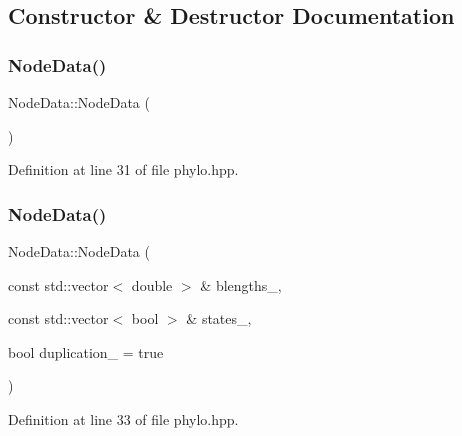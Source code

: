 \subsection{Constructor \& Destructor Documentation}
\mbox{\label{class_node_data_a56da12a9de7c80c25a905012749c8671}} 
\subsubsection{\texorpdfstring{Node\+Data()}{NodeData()}\hspace{0.1cm}{\footnotesize\ttfamily [1/2]}}
{\footnotesize\ttfamily Node\+Data\+::\+Node\+Data (\begin{DoxyParamCaption}{ }\end{DoxyParamCaption})\hspace{0.3cm}{\ttfamily [inline]}}



Definition at line 31 of file phylo.\+hpp.

\mbox{\label{class_node_data_a0a90191ba4c987afa3406f829967d8e2}} 
\subsubsection{\texorpdfstring{Node\+Data()}{NodeData()}\hspace{0.1cm}{\footnotesize\ttfamily [2/2]}}
{\footnotesize\ttfamily Node\+Data\+::\+Node\+Data (\begin{DoxyParamCaption}\item[{const std\+::vector$<$ double $>$ \&}]{blengths\+\_\+,  }\item[{const std\+::vector$<$ bool $>$ \&}]{states\+\_\+,  }\item[{bool}]{duplication\+\_\+ = {\ttfamily true} }\end{DoxyParamCaption})\hspace{0.3cm}{\ttfamily [inline]}}



Definition at line 33 of file phylo.\+hpp.

\mbox{\label{class_node_data_ad870d466c40b9be96ad79adccab79038}} 
